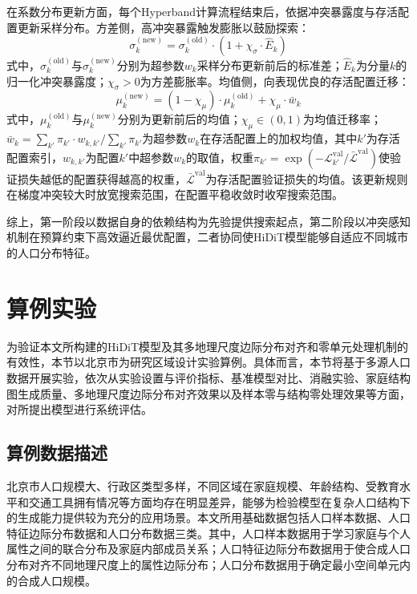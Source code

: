 在系数分布更新方面，每个Hyperband计算流程结束后，依据冲突暴露度与存活配置更新采样分布。方差侧，高冲突暴露触发膨胀以鼓励探索：
\begin{equation}
  \sigma_{k}^{(\mathrm{new})} = \sigma_{k}^{(\mathrm{old})} \cdot \left(1 + \chi_{\sigma} \cdot \hat{E}_{k}\right)
  \label{eq.popsyn.sigmaupdate}
\end{equation}
式中，$\sigma_{k}^{(\mathrm{old})}$与$\sigma_{k}^{(\mathrm{new})}$分别为超参数$w_k$采样分布更新前后的标准差；$\hat{E}_{k}$为分量$k$的归一化冲突暴露度；$\chi_{\sigma} > 0$为方差膨胀率。均值侧，向表现优良的存活配置迁移：
\begin{equation}
  \mu_{k}^{(\mathrm{new})} = \left(1 - \chi_{\mu}\right) \cdot \mu_{k}^{(\mathrm{old})} + \chi_{\mu} \cdot \bar{w}_{k}
  \label{eq.popsyn.muupdate}
\end{equation}
式中，$\mu_{k}^{(\mathrm{old})}$与$\mu_{k}^{(\mathrm{new})}$分别为更新前后的均值；$\chi_{\mu} \in (0, 1)$为均值迁移率；$\bar{w}_{k} = \sum_{k'} \pi_{k'} \cdot w_{k, k'} \big/ \sum_{k'} \pi_{k'}$为超参数$w_k$在存活配置上的加权均值，其中$k'$为存活配置索引，$w_{k, k'}$为配置$k'$中超参数$w_k$的取值，权重$\pi_{k'} = \exp\!\left(-\mathcal{L}_{k'}^{\mathrm{val}} \big/ \bar{\mathcal{L}}^{\mathrm{val}}\right)$使验证损失越低的配置获得越高的权重，$\bar{\mathcal{L}}^{\mathrm{val}}$为存活配置验证损失的均值。该更新规则在梯度冲突较大时放宽搜索范围，在配置平稳收敛时收窄搜索范围。
 
综上，第一阶段以数据自身的依赖结构为先验提供搜索起点，第二阶段以冲突感知机制在预算约束下高效逼近最优配置，二者协同使HiDiT模型能够自适应不同城市的人口分布特征。

\section{算例实验}\label{sec.popsyn.experiment}

为验证本文所构建的HiDiT模型及其多地理尺度边际分布对齐和零单元处理机制的有效性，本节以北京市为研究区域设计实验算例。具体而言，本节将基于多源人口数据开展实验，依次从实验设置与评价指标、基准模型对比、消融实验、家庭结构图生成质量、多地理尺度边际分布对齐效果以及样本零与结构零处理效果等方面，对所提出模型进行系统评估。

\subsection{算例数据描述}\label{subsec.popsyn.experiment.data}

北京市人口规模大、行政区类型多样，不同区域在家庭规模、年龄结构、受教育水平和交通工具拥有情况等方面均存在明显差异，能够为检验模型在复杂人口结构下的生成能力提供较为充分的应用场景。本文所用基础数据包括人口样本数据、人口特征边际分布数据和人口分布数据三类。其中，人口样本数据用于学习家庭与个人属性之间的联合分布及家庭内部成员关系；人口特征边际分布数据用于使合成人口分布对齐不同地理尺度上的属性边际分布；人口分布数据用于确定最小空间单元内的合成人口规模。

